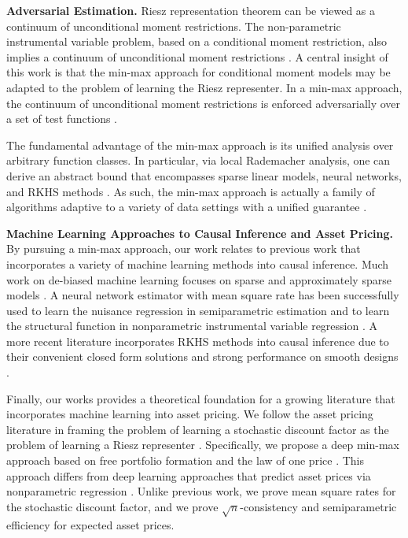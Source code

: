 \textbf{Adversarial Estimation.} Riesz representation theorem can be viewed as a continuum of unconditional moment restrictions. The non-parametric instrumental variable problem, based on a conditional moment restriction, also implies a continuum of unconditional moment restrictions \cite{newey2003instrumental,hall2005nonparametric,blundell2007semi,chen2009efficient,darolles2011nonparametric,chen2012estimation,chen2015sieve,chen2018optimal}. A central insight of this work is that the min-max approach for conditional moment models may be adapted to the problem of learning the Riesz representer. In a min-max approach, the continuum of unconditional moment restrictions is enforced adversarially over a set of test functions \cite{goodfellow2014generative,arjovsky2017wasserstein,dikkala2020minimax}. 

The fundamental advantage of the min-max approach is its unified analysis over arbitrary function classes. In particular, via local Rademacher analysis, one can derive an abstract bound that encompasses sparse linear models, neural networks, and RKHS methods \cite{koltchinskii2000rademacher,bartlett2005local}. As such, the min-max approach is actually a family of algorithms adaptive to a variety of data settings with a unified guarantee \cite{negahban2012,lecue2017regularization,Lecue2018}. 

\textbf{Machine Learning Approaches to Causal Inference and Asset Pricing.} By pursuing a min-max approach, our work relates to previous work that incorporates a variety of machine learning methods into causal inference. Much work on de-biased machine learning focuses on sparse and approximately sparse models \cite{chernozhukov2018global,chernozhukov2018learning,chernozhukov2018plug}. A neural network estimator with mean square rate has been successfully used to learn the nuisance regression in semiparametric estimation \cite{chen1999improved,farrell2018deep} and to learn the structural function in nonparametric instrumental variable regression \cite{deepiv,bennett2019deep,dikkala2020minimax}. A more recent literature incorporates RKHS methods into causal inference due to their convenient closed form solutions and strong performance on smooth designs \cite{nie2017quasi,singh2019kernel,muandet2019dual,singh2020kernel,muandet2020kernel}.

Finally, our works provides a theoretical foundation for a growing literature that incorporates machine learning into asset pricing. We follow the asset pricing literature in framing the problem of learning a stochastic discount factor as the problem of learning a Riesz representer \cite{hansen1997assessing}. Specifically, we propose a deep min-max approach based on free portfolio formation and the law of one price \cite{bansal1993no,chen2019deep}. This approach differs from deep learning approaches that predict asset prices via nonparametric regression \cite{messmer2017deep,feng2018deep,gu2020autoencoder,bianchi2020bond}. Unlike previous work, we prove mean square rates for the stochastic discount factor, and we prove $\sqrt{n}$-consistency and semiparametric efficiency for expected asset prices.